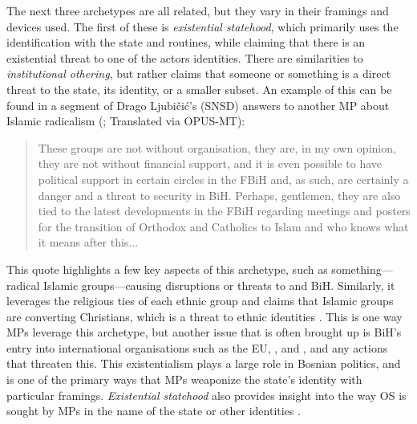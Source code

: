 The next three archetypes are all related, but they vary in their framings and devices used. The first of these is \textit{existential statehood}, which primarily uses the identification with the state and routines, while claiming that there is an existential threat to one of the actors identities. There are similarities to \textit{institutional othering}, but rather claims that someone or something is a direct threat to the state, its identity, or a smaller subset. An example of this can be found in a segment of Drago Ljubi{\v c}i{\'c}'s (\ac{SNSD}) answers to another MP about Islamic radicalism (\citealp{mochtak2022}; Translated via OPUS-MT):
\begin{quote}
    These groups are not without organisation, they are, in my own opinion, they are not without financial support, and it is even possible to have political support in certain circles in the \acl{FBiH} and, as such, are certainly a danger and a threat to security in \ac{BiH}. Perhaps, gentlemen, they are also tied to the latest developments in the \acl{FBiH} regarding meetings and posters for the transition of Orthodox and Catholics to Islam and who knows what it means after this...
\end{quote}
This quote highlights a few key aspects of this archetype, such as something---radical Islamic groups---causing disruptions or threats to  and \ac{BiH}. Similarly, it leverages the religious ties of each ethnic group and claims that Islamic groups are converting Christians, which is a threat to ethnic identities \citep[pg.~759]{kinnvall2004}. This is one way \acp{MP} leverage this archetype, but another issue that is often brought up is \ac{BiH}'s entry into international organisations such as the \ac{EU}, , and , and any actions that threaten this. This existentialism plays a large role in Bosnian politics, and is one of the primary ways that \acp{MP} weaponize the state's identity with particular framings. \textit{Existential statehood} also provides insight into the way \ac{OS} is sought by \acp{MP} in the name of the state or other identities \citep[pg.~614]{subotic2015}.

